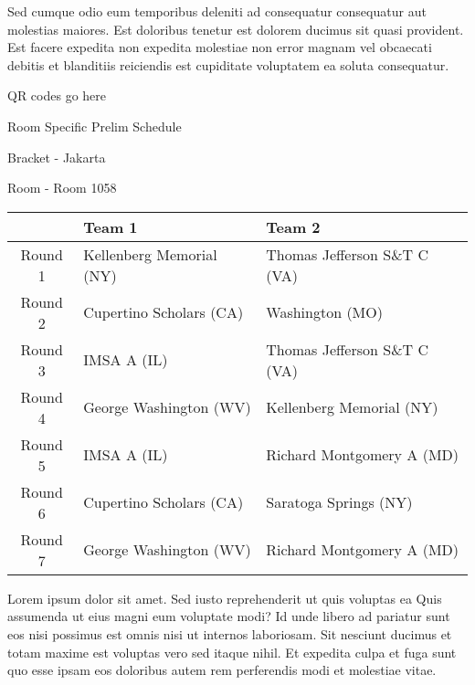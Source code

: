 \documentclass{article}%
\begin{document}
\newline%
Sed cumque odio eum temporibus deleniti ad consequatur consequatur aut molestias maiores. Est doloribus tenetur est dolorem ducimus sit quasi provident. Est facere expedita non expedita molestiae non error magnam vel obcaecati debitis et blanditiis reiciendis est cupiditate voluptatem ea soluta consequatur.%
\vspace*{140pt}%
\begin{center}%
\begin{Huge}%
QR codes go here%
\end{Huge}%
\end{center}%
\newpage%
\begin{center}%
\begin{Huge}%
Room Specific Prelim Schedule%
\end{Huge}%
\vspace*{8pt}%
\linebreak%
\begin{Large}%
Bracket {-} Jakarta%
\end{Large}%
\vspace*{8pt}%
\linebreak%
\vspace*{8pt}%
\begin{Large}%
Room {-} Room 1058%
\end{Large}%
\end{center}%
%
\begin{tabularx}{\textwidth}{|c|Y|Y|}%
\hline%
&Team 1&Team 2\\%
\hline%
Round 1&Kellenberg Memorial (NY)&Thomas Jefferson S\&T C (VA)\\%
Round 2&Cupertino Scholars (CA)&Washington (MO)\\%
Round 3&IMSA A (IL)&Thomas Jefferson S\&T C (VA)\\%
Round 4&George Washington (WV)&Kellenberg Memorial (NY)\\%
Round 5&IMSA A (IL)&Richard Montgomery A (MD)\\%
Round 6&Cupertino Scholars (CA)&Saratoga Springs (NY)\\%
Round 7&George Washington (WV)&Richard Montgomery A (MD)\\%
\hline%
\end{tabularx}%
\vspace*{8pt}%
\newline%
Lorem ipsum dolor sit amet. Sed iusto reprehenderit ut quis voluptas ea Quis assumenda ut eius magni eum voluptate modi? Id unde libero ad pariatur sunt eos nisi possimus est omnis nisi ut internos laboriosam. Sit nesciunt ducimus et totam maxime est voluptas vero sed itaque nihil. Et expedita culpa et fuga sunt quo esse ipsam eos doloribus autem rem perferendis modi et molestiae vitae.\newline%
\end{document}
